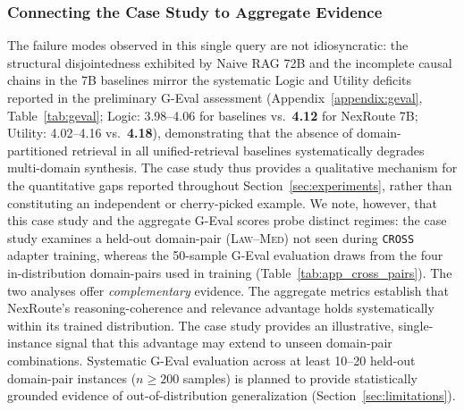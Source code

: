 \documentclass[a4paper,fleql]{cas-sc}
\begin{document}
\subsubsection{Connecting the Case Study to Aggregate Evidence}
\label{sssec:connecting-aggregate}
The failure modes observed in this single query are not idiosyncratic: the
structural disjointedness exhibited by Naive RAG 72B and the incomplete
causal chains in the 7B baselines mirror the systematic Logic and Utility
deficits reported in the preliminary G-Eval assessment (Appendix~\ref{appendix:geval}, Table~\ref{tab:geval}; Logic: 3.98--4.06 for
baselines vs.\ \textbf{4.12} for NexRoute 7B; Utility: 4.02--4.16 vs.\
\textbf{4.18}), demonstrating that the absence of domain-partitioned retrieval
in all unified-retrieval baselines systematically degrades multi-domain
synthesis. The case study thus provides a qualitative mechanism for the
quantitative gaps reported throughout Section~\ref{sec:experiments}, rather
than constituting an independent or cherry-picked example. We note, however,
that this case study and the aggregate G-Eval scores probe distinct
regimes: the case study examines a held-out domain-pair (\textsc{Law}--\textsc{Med})
not seen during \texttt{CROSS} adapter training, whereas the 50-sample
G-Eval evaluation draws from the four in-distribution domain-pairs used in
training (Table~\ref{tab:app_cross_pairs}). The two analyses offer \emph{complementary} evidence. The aggregate metrics
establish that NexRoute's reasoning-coherence and relevance advantage holds
systematically within its trained distribution. The case study provides an
illustrative, single-instance signal that this advantage may extend to unseen
domain-pair combinations. Systematic G-Eval evaluation across at least
10--20 held-out domain-pair instances ($n{\geq}200$ samples) is planned
to provide statistically grounded evidence of out-of-distribution
generalization (Section~\ref{sec:limitations}).

\end{document}
